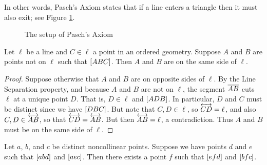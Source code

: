 In other words, Pasch's Axiom states that if a line enters a triangle then it must also exit; see Figure \ref{fig:pasch}.

\begin{figure}[h]
\begin{center}
\caption{\label{fig:pasch}The setup of Pasch's Axiom}
\end{center}
\end{figure}

\begin{lem}\label{lem:betweenness-separation}
Let \(\ell\) be a line and \(C \in \ell\) a point in an ordered geometry.
Suppose \(A\) and \(B\) are points not on \(\ell\) such that \([ A B C ]\).
Then \(A\) and \(B\) are on the same side of \(\ell\).
\end{lem}

\begin{proof}
Suppose otherwise that \(A\) and \(B\) are on opposite sides of \(\ell\).
By the Line Separation property, and because \(A\) and \(B\) are not on \(\ell\), the segment \(\overline{AB}\) cuts \(\ell\) at a unique point \(D\).
That is, \(D \in \ell\) and \([ A D B ]\).
In particular, \(D\) and \(C\) must be distinct since we have \([ D B C ]\).
But note that \(C, D \in \ell\), so \(\overleftrightarrow{CD} = \ell\), and also \(C, D \in \overleftrightarrow{AB}\), so that \(\overleftrightarrow{CD} = \overleftrightarrow{AB}\).
But then \(\overleftrightarrow{AB} = \ell\), a contradiction.
Thus \(A\) and \(B\) must be on the same side of \(\ell\).
\end{proof}



\Exercises%

\begin{exercise}
Let \(a\), \(b\), and \(c\) be distinct noncollinear points.
Suppose we have points \(d\) and \(e\) such that \([ a b d ]\) and \([ a e c ]\).
Then there exists a point \(f\) such that \([ e f d ]\) and \([ b f c ]\).
\end{exercise}

